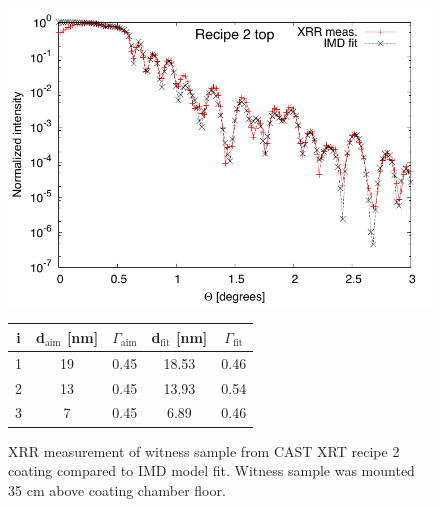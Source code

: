 \begin{figure}[h!]
\centering
\begin{minipage}{.47\textwidth}
  \centering
  \includegraphics[width=\linewidth]{figures/cast/cast_recipe2_fit1.pdf}
\end{minipage}%
\begin{minipage}{.53\textwidth}
  \centering
  \footnotesize
  \begin{tabular}{c|c|c|c|c}
  i&d$_{\text{aim}}$ [nm]&$\Gamma_{\text{aim}}$&d$_{\text{fit}}$ [nm]&$\Gamma_{\text{fit}}$\\
  \hline
  1&19&0.45&18.53&0.46\\
  2&13&0.45&13.93&0.54\\
  3&7&0.45&6.89&0.46
  \end{tabular}
\end{minipage}
\caption{\footnotesize XRR measurement of witness sample from CAST XRT recipe 2 coating compared to IMD model fit. Witness sample was mounted 35 cm above coating chamber floor.}\label{fig:cast_fit_rec2-1}
\end{figure}

